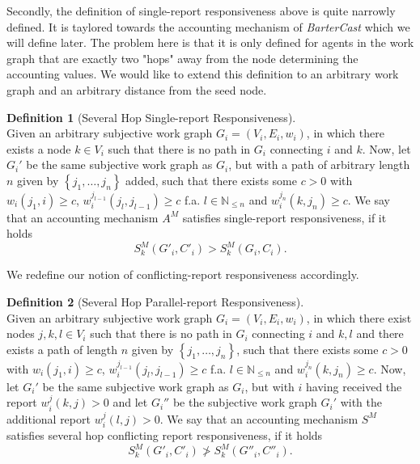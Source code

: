 \documentclass[11pt,a4paper]{report}
\theoremstyle{definition}
\newtheorem{definition}{Definition}[section]
\theoremstyle{theorem}
\theoremstyle{proposition}
\theoremstyle{corollary}
\theoremstyle{lemma}
\theoremstyle{example}
\theoremstyle{remark}
\begin{document}
\noindent{}Secondly, the definition of single-report responsiveness above is quite narrowly defined. It is taylored towards the accounting mechanism of {\it BarterCast} which we will define later. The problem here is that it is only defined for agents in the work graph that are exactly two "hops" away from the node determining the accounting values. We would like to extend this definition to an arbitrary work graph and an arbitrary distance from the seed node. \vspace{1em}\\

\begin{definition}[Several Hop Single-report Responsiveness]\ \\
Given an arbitrary subjective work graph $G_i=(V_i,E_i,w_i)$, in which there exists a node $k\in{}V_i$ such that there is no path in $G_i$ connecting $i$ and $k$. Now, let $G_i'$ be the same subjective work graph as $G_i$, but with a path of arbitrary length $n$ given by $\left\lbrace{}j_1,\ldots,j_n\right\rbrace$ added, such that there exists some $c>0$ with $w_i(j_1,i)\geq{}c$, $w_i^{j_{l-1}}(j_l,j_{l-1})\geq{}c$ f.a. $l\in\mathbb{N}_{\leq{}n}$ and $w_i^{j_n}(k,j_n)\geq{}c$. We say that an accounting mechanism $A^M$ satisfies single-report responsiveness, if it holds
\[
S^M_k(G'_i,C'_i)>S^M_k(G_i,C_i).
\]
\end{definition}

\noindent{}We redefine our notion of conflicting-report responsiveness accordingly.\vspace{1em}\\

\begin{definition}[Several Hop Parallel-report Responsiveness]\ \\
Given an arbitrary subjective work graph $G_i=(V_i,E_i,w_i)$, in which there exist nodes $j,k,l\in{}V_i$ such that there is no path in $G_i$ connecting $i$ and $k,l$ and there exists a path of length $n$ given by $\left\lbrace{}j_1,\ldots,j_n\right\rbrace$, such that there exists some $c>0$ with $w_i(j_1,i)\geq{}c$, $w_i^{j_{l-1}}(j_l,j_{l-1})\geq{}c$ f.a. $l\in\mathbb{N}_{\leq{}n}$ and $w_i^{j_n}(k,j_n)\geq{}c$. Now, let $G_i'$ be the same subjective work graph as $G_i$, but with $i$ having received the report $w_i^j(k,j)>0$ and let $G_i''$ be the subjective work graph $G_i'$ with the additional report $w_i^j(l,j)>0$. We say that an accounting mechanism $S^M$ satisfies several hop conflicting report responsiveness, if it holds
\[
S^M_k(G'_i,C'_i)\not > S^M_k(G''_i,C''_i).
\]
\end{definition}
\end{document}
